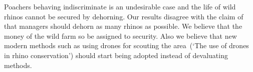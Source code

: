 \documentclass[10pt]{article}
\begin{document}
Poachers behaving indiscriminate is an undesirable case and the life of
wild rhinos cannot be secured by dehorning. Our results disagree with the
claim of~\cite{Milner1992} that managers should dehorn
as many rhinos as possible. We believe that the money of the wild farm 
so be assigned to security. Also we believe that new modern methods such as
using drones for scouting the area~\cite{Saverhino}(`The use of drones in rhino
conservation') should start being adopted instead of devaluating methods.



\end{document}
